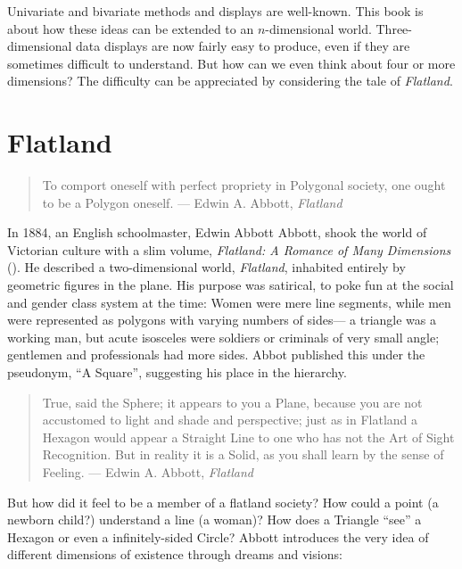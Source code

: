 \documentclass[
  letterpaper,
  10pt,
  krantz2]{krantz}
\begin{document}
Univariate and bivariate methods and displays are well-known. This book
is about how these ideas can be extended to an \(n\)-dimensional world.
Three-dimensional data displays are now fairly easy to produce, even if
they are sometimes difficult to understand. But how can we even think
about four or more dimensions? The difficulty can be appreciated by
considering the tale of \emph{Flatland}.

\section*{Flatland}\label{flatland}


\begin{quote}
To comport oneself with perfect propriety in Polygonal society, one
ought to be a Polygon oneself. --- Edwin A. Abbott, \emph{Flatland}
\end{quote}

In 1884, an English schoolmaster, Edwin Abbott Abbott, shook the world
of Victorian culture with a slim volume, \emph{Flatland: A Romance of
Many Dimensions} (). He
described a two-dimensional world, \emph{Flatland}, inhabited entirely
by geometric figures in the plane. His purpose was satirical, to poke
fun at the social and gender class system at the time: Women were mere
line segments, while men were represented as polygons with varying
numbers of sides--- a triangle was a working man, but acute isosceles
were soldiers or criminals of very small angle; gentlemen and
professionals had more sides. Abbot published this under the pseudonym,
``A Square'', suggesting his place in the hierarchy.

\begin{quote}
True, said the Sphere; it appears to you a Plane, because you are not
accustomed to light and shade and perspective; just as in Flatland a
Hexagon would appear a Straight Line to one who has not the Art of Sight
Recognition. But in reality it is a Solid, as you shall learn by the
sense of Feeling. --- Edwin A. Abbott, \emph{Flatland}
\end{quote}

But how did it feel to be a member of a flatland society? How could a
point (a newborn child?) understand a line (a woman)? How does a
Triangle ``see'' a Hexagon or even a infinitely-sided Circle? Abbott
introduces the very idea of different dimensions of existence through
dreams and visions:
\end{document}

